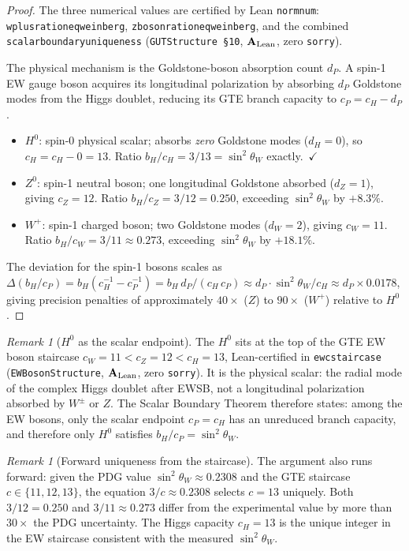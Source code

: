 \documentclass[11pt]{article}
\theoremstyle{remark}
\newtheorem{remark}[theorem]{Remark}
\newcommand{\bH}{b_H}
\newcommand{\cH}{c_H}
\newcommand{\lean}[1]{%
  \penalty-100
  \begingroup\def\_{\textunderscore\allowbreak}\texttt{#1}\endgroup}
\newcommand{\sinwsq}{\sin^2\!\theta_W}
\newcommand{\CatAL}{\ensuremath{\textbf{A}_{\rm Lean}}}
\begin{document}
\begin{proof}
The three numerical values are certified by Lean \lean{norm\_num}:
\lean{w\_plus\_ratio\_neq\_weinberg}, \lean{z\_boson\_ratio\_neq\_weinberg}, and the
combined \lean{scalar\_boundary\_uniqueness}
(\texttt{GUTStructure~\S10}, $\CatAL$, zero \texttt{sorry}).

The physical mechanism is the Goldstone-boson absorption count $d_P$.
A spin-1 EW gauge boson acquires its longitudinal polarization by absorbing $d_P$
Goldstone modes from the Higgs doublet, reducing its GTE branch capacity to
$c_P = \cH - d_P$.
\begin{itemize}[noitemsep]
\item $H^0$: spin-0 physical scalar; absorbs \emph{zero} Goldstone modes ($d_H = 0$),
  so $c_H = \cH - 0 = 13$.
  Ratio $\bH/c_H = 3/13 = \sinwsq$ exactly.~$\checkmark$
\item $Z^0$: spin-1 neutral boson; one longitudinal Goldstone absorbed ($d_Z = 1$),
  giving $c_Z = 12$.
  Ratio $\bH/c_Z = 3/12 = 0.250$, exceeding $\sinwsq$ by $+8.3\%$.
\item $W^+$: spin-1 charged boson; two Goldstone modes ($d_W = 2$), giving $c_W = 11$.
  Ratio $\bH/c_W = 3/11 \approx 0.273$, exceeding $\sinwsq$ by $+18.1\%$.
\end{itemize}
The deviation for the spin-1 bosons scales as
$\Delta(\bH/c_P) = \bH(c_H^{-1} - c_P^{-1}) = \bH\,d_P/(c_H\,c_P) \approx
d_P \cdot \sinwsq/\cH \approx d_P \times 0.0178$,
giving precision penalties of approximately $40\times$ ($Z$) to $90\times$ ($W^+$)
relative to $H^0$.
\end{proof}

\begin{remark}[$H^0$ as the scalar endpoint]
\label{rem:higgs_endpoint}
The $H^0$ sits at the top of the GTE EW boson staircase
$c_W = 11 < c_Z = 12 < c_H = 13$, Lean-certified in \lean{ew\_c\_staircase}
(\texttt{EWBosonStructure}, $\CatAL$, zero \texttt{sorry}).
It is the physical scalar: the radial mode of the complex Higgs doublet after EWSB,
not a longitudinal polarization absorbed by $W^{\pm}$ or $Z$.
The Scalar Boundary Theorem therefore states: among the EW bosons, only the
scalar endpoint $c_P = \cH$ has an unreduced branch capacity, and therefore only
$H^0$ satisfies $\bH/c_P = \sinwsq$.
\end{remark}

\begin{remark}[Forward uniqueness from the staircase]
\label{rem:forward_unique}
The argument also runs forward: given the PDG value $\sinwsq \approx 0.2308$ and
the GTE staircase $c \in \{11, 12, 13\}$, the equation $3/c \approx 0.2308$ selects
$c = 13$ uniquely.
Both $3/12 = 0.250$ and $3/11 \approx 0.273$ differ from the experimental value by
more than $30\times$ the PDG uncertainty.
The Higgs capacity $c_H = 13$ is the unique integer in the EW staircase consistent
with the measured $\sinwsq$.
\end{remark}
\end{document}
